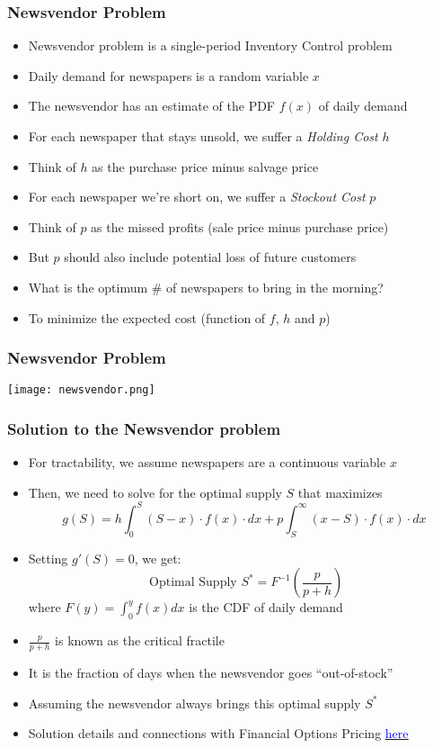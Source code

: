 \documentclass[handout]{beamer}
\begin{document}
\begin{frame}
\frametitle{Newsvendor Problem}
\pause
\begin{itemize}[<+->]
\item Newsvendor problem is a single-period Inventory Control problem
\item Daily demand for newspapers is a random variable $x$
\item The newsvendor has an estimate of the PDF $f(x)$ of daily demand
\item For each newspaper that stays unsold, we suffer a {\em Holding Cost} $h$
\item Think of $h$ as the purchase price minus salvage price
\item For each newspaper we're short on, we suffer a {\em Stockout Cost} $p$
\item Think of $p$ as the missed profits (sale price minus purchase price)
\item But $p$ should also include potential loss of future customers
\item What is the optimum \# of newspapers to bring in the morning?
\item To minimize the expected cost (function of $f$, $h$ and $p$)
\end{itemize}
\end{frame}

\begin{frame}
\frametitle{Newsvendor Problem}
\texttt{[image: newsvendor.png]}
\end{frame}

\begin{frame}
\frametitle{Solution to the Newsvendor problem}
\pause
\begin{itemize}[<+->]
\item For tractability, we assume newspapers are a continuous variable $x$
\item Then, we need to solve for the optimal supply $S$ that maximizes
$$g(S) = h \int_0^S (S-x) \cdot f(x) \cdot dx + p \int_S^{\infty} (x-S) \cdot f(x) \cdot dx$$
\item Setting $g'(S) =0$, we get:
$$\mbox{ Optimal Supply } S^* = F^{-1}(\frac p {p+h})$$
where $F(y) = \int_0^y f(x) dx$ is the CDF of daily demand
\item $\frac p {p+h}$ is known as the critical fractile
\item It is the fraction of days when the newsvendor goes ``out-of-stock''
\item Assuming the newsvendor always brings this optimal supply $S^*$
\item Solution details and connections with Financial Options Pricing \href{https://github.com/coverdrive/technical-documents/blob/master/supply_chain/NewsvendorOptionsPricing/NewsvendorOptionsPricing.pdf}{\underline{\textcolor{blue}{here}}}
\end{itemize}
\end{frame}
\end{document}

